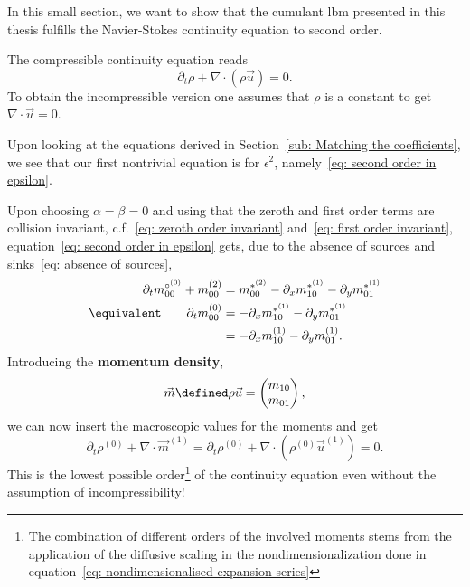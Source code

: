 In this small section, we want to show that the cumulant \gls{lbm} presented in this thesis fulfills the Navier-Stokes continuity equation to second order.

The compressible continuity equation reads
\begin{equation}
  \label{eq: continuity equation}
  \partial_t \rho + \nabla \cdot (\rho \vec{u}) = 0.
\end{equation}
To obtain the incompressible version one assumes that $\rho$ is a constant to get $\nabla\cdot\vec{u}=0$.

Upon looking at the equations derived in Section~\ref{sub: Matching the coefficients}, we see that our first nontrivial equation is for $\epsilon^2$, namely~\eqref{eq: second order in epsilon}.

Upon choosing $\alpha=\beta=0$ and using that the zeroth and first order terms are collision invariant, c.f.~\eqref{eq: zeroth order invariant} and~\eqref{eq: first order invariant}, equation~\eqref{eq: second order in epsilon} gets, due to the absence of sources and sinks~\eqref{eq: absence of sources},
\begin{align}
  \nonumber
  \partial_t m_{00}^{\circ^{(0)}} + m_{00}^{(2)} & =  m_{00}^{*^{(2)}} - \partial_x m_{10}^{*^{(1)}} - \partial_y m_{01}^{*^{(1)}}
   \\\equivalent \qquad
   \partial_t m_{00}^{(0)} & =  - \partial_x m_{10}^{*^{(1)}} - \partial_y m_{01}^{*^{(1)}} \nonumber
   \\
    & =  - \partial_x m_{10}^{(1)} - \partial_y m_{01}^{(1)}.
  \label{eq: continuity moments}
\end{align}
Introducing the \textbf{momentum density},
\begin{equation*}
  \vec{m} \defined \rho \vec{u} = \begin{pmatrix}m_{10} \\m_{01}  \end{pmatrix},
\end{equation*}
we can now insert the macroscopic values for the moments and get
\begin{equation}
  \partial_t \rho^{(0)} + \nabla \cdot \vec{m}^{(1)} =
  \partial_t \rho^{(0)} + \nabla \cdot (\rho^{(0)} \vec{u}^{(1)}) = 0.
\end{equation}
This is the lowest possible order\footnote{The combination of different orders of the involved moments stems from the application of the diffusive scaling in the nondimensionalization done in equation~\eqref{eq: nondimensionalised expansion series}} of the continuity equation even without the assumption of incompressibility!

